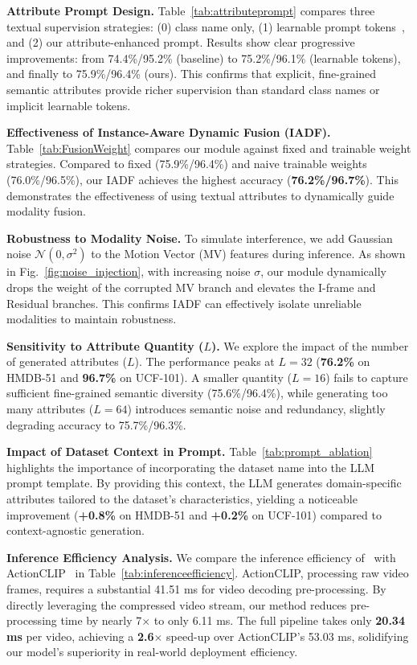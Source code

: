\documentclass[runningheads]{llncs}
\begin{document}
\noindent\textbf{Attribute Prompt Design.} Table~\ref{tab:attributeprompt} compares three textual supervision strategies: (0) class name only, (1) learnable prompt tokens~\cite{zhou2022learning}, and (2) our attribute-enhanced prompt. Results show clear progressive improvements: from 74.4\%/95.2\% (baseline) to 75.2\%/96.1\% (learnable tokens), and finally to 75.9\%/96.4\% (ours). This confirms that explicit, fine-grained semantic attributes provide richer supervision than standard class names or implicit learnable tokens.

\noindent\textbf{Effectiveness of Instance-Aware Dynamic Fusion (IADF).} Table~\ref{tab:FusionWeight} compares our module against fixed and trainable weight strategies. Compared to fixed (75.9\%/96.4\%) and naive trainable weights (76.0\%/96.5\%), our IADF achieves the highest accuracy (\textbf{76.2\%/96.7\%}). This demonstrates the effectiveness of using textual attributes to dynamically guide modality fusion.

\noindent\textbf{Robustness to Modality Noise.} To simulate interference, we add Gaussian noise $\mathcal{N}(0, \sigma^2)$ to the Motion Vector (MV) features during inference. As shown in Fig.~\ref{fig:noise_injection}, with increasing noise $\sigma$, our module dynamically drops the weight of the corrupted MV branch and elevates the I-frame and Residual branches. This confirms IADF can effectively isolate unreliable modalities to maintain robustness.

\noindent\textbf{Sensitivity to Attribute Quantity ($L$).} We explore the impact of the number of generated attributes ($L$). The performance peaks at $L=32$ (\textbf{76.2\%} on HMDB-51 and \textbf{96.7\%} on UCF-101). A smaller quantity ($L=16$) fails to capture sufficient fine-grained semantic diversity (75.6\%/96.4\%), while generating too many attributes ($L=64$) introduces semantic noise and redundancy, slightly degrading accuracy to 75.7\%/96.3\%.

\noindent\textbf{Impact of Dataset Context in Prompt.} Table~\ref{tab:prompt_ablation} highlights the importance of incorporating the dataset name into the LLM prompt template. By providing this context, the LLM generates domain-specific attributes tailored to the dataset's characteristics, yielding a noticeable improvement (\textbf{+0.8\%} on HMDB-51 and \textbf{+0.2\%} on UCF-101) compared to context-agnostic generation.

\noindent\textbf{Inference Efficiency Analysis.} We compare the inference efficiency of \methodname~with ActionCLIP~\cite{wang2021actionclipnewparadigmvideo} in Table~\ref{tab:inferenceefficiency}. ActionCLIP, processing raw video frames, requires a substantial 41.51 ms for video decoding pre-processing. By directly leveraging the compressed video stream, our method reduces pre-processing time by nearly 7$\times$ to only 6.11 ms. The full pipeline takes only \textbf{20.34 ms} per video, achieving a \textbf{2.6$\times$} speed-up over ActionCLIP's 53.03 ms, solidifying our model's superiority in real-world deployment efficiency.
\end{document}
